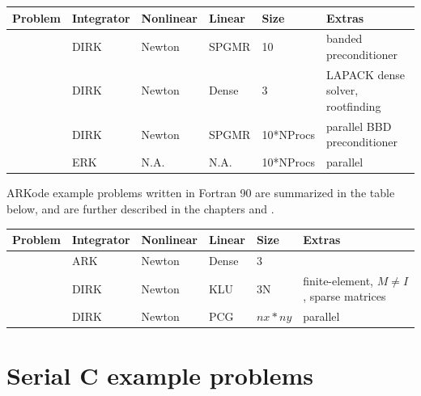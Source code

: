 \documentclass[letterpaper,10pt,english]{sphinxmanual}
\begin{document}
\begin{tabulary}{\linewidth}{|L|L|L|L|L|L|}
\hline
\textsf{\relax 
Problem
} & \textsf{\relax 
Integrator
} & \textsf{\relax 
Nonlinear
} & \textsf{\relax 
Linear
} & \textsf{\relax 
Size
} & \textsf{\relax 
Extras
}\\
\hline
{\hyperref[f77_serial:fark-diurnal-kry-bp]{\emph{}}}
 & 
DIRK
 & 
Newton
 & 
SPGMR
 & 
10
 & 
banded preconditioner
\\
\hline
{\hyperref[f77_serial:fark-roberts-dnsl]{\emph{}}}
 & 
DIRK
 & 
Newton
 & 
Dense
 & 
3
 & 
LAPACK dense solver, rootfinding
\\
\hline
{\hyperref[f77_parallel:fark-diag-kry-bbd-p]{\emph{}}}
 & 
DIRK
 & 
Newton
 & 
SPGMR
 & 
10*NProcs
 & 
parallel BBD preconditioner
\\
\hline
{\hyperref[f77_parallel:fark-diag-non-p]{\emph{}}}
 & 
ERK
 & 
N.A.
 & 
N.A.
 & 
10*NProcs
 & 
parallel
\\
\hline\end{tabulary}


ARKode example problems written in Fortran 90 are summarized in the table
below, and are further described in the chapters {\hyperref[f90_serial:serial-f90]{\emph{}}} and
{\hyperref[f90_parallel:parallel-f90]{\emph{}}}.

\begin{tabulary}{\linewidth}{|L|L|L|L|L|L|}
\hline
\textsf{\relax 
Problem
} & \textsf{\relax 
Integrator
} & \textsf{\relax 
Nonlinear
} & \textsf{\relax 
Linear
} & \textsf{\relax 
Size
} & \textsf{\relax 
Extras
}\\
\hline
{\hyperref[f90_serial:ark-bruss]{\emph{}}}
 & 
ARK
 & 
Newton
 & 
Dense
 & 
3
 & \\
\hline
{\hyperref[f90_serial:ark-bruss1d-fem-klu]{\emph{}}}
 & 
DIRK
 & 
Newton
 & 
KLU
 & 
3N
 & 
finite-element, \(M\ne I\), sparse matrices
\\
\hline
{\hyperref[f90_parallel:fark-heat2d]{\emph{}}}
 & 
DIRK
 & 
Newton
 & 
PCG
 & 
\(nx*ny\)
 & 
parallel
\\
\hline\end{tabulary}



\chapter{Serial C example problems}
\label{c_serial:serial-c}\label{c_serial::doc}\label{c_serial:arkode-example-documentation}\label{c_serial:serial-c-example-problems}
\end{document}
